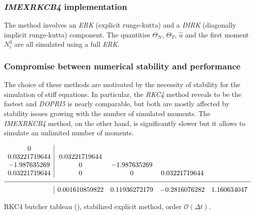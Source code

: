\documentclass[final]{jpp}
\begin{document}
\subsubsection{\textit{IMEXRKCB4} implementation}
The method involves an \textit{ERK} (explicit runge-kutta) and a \textit{DIRK} (diagonally implicit runge-kutta) component. The quantities $\Theta_N$, $\Theta_T$, $\hat{u}$ and the first moment $N_e^3$ are all simulated using a full \textit{ERK}.

\subsubsection{Compromise between numerical stability and performance}
The choice of these methods are motivated by the necessity of stability for the simulation of stiff equations. In particular, the \textit{RKC4} method reveals to be the fastest and \textit{DOPRI5} is nearly comparable, but both are mostly affected by stability issues growing with the number of simulated moments. The \textit{IMEXRKCB4} method, on the other hand, is significantly slower but it allows to simulate an unlimited number of moments.


\begin{table}
\renewcommand\arraystretch{1.2}
\[
\begin{array}
{c|cccc}
0\\
0.03221719644 & 0.03221719644 \\
-1.987635269 & 0 & -1.987635269 \\
0.03221719644 & 0 & 0& 0.03221719644\\
\hline
& 0.001610859822 & 0.11936272179 & -0.2816076282  & 1.160634047 
\end{array}
\]
\caption{RKC4 butcher tableau (\cite{doerk}), stabilized explicit method, order $\mathcal{O}(\Delta t)$.}
\label{tab:rkc4}
\end{table}
\end{document}
